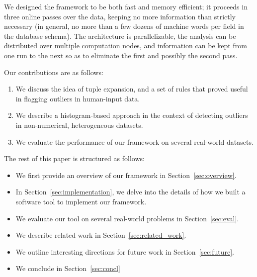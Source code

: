 We designed the framework to be both fast and memory efficient; it proceeds in three online passes over the data, keeping no more information than strictly necessary (in general, no more than a few dozens of machine words per field in the database schema). The architecture is parallelizable, the analysis can be distributed over multiple computation nodes, and information can be kept from one run to the next so as to eliminate the first and possibly the second pass.

Our contributions are as follows:
\begin{enumerate}
\item We discuss the idea of tuple expansion, and a set of rules that proved useful in flagging outliers in human-input data.
\item We describe a histogram-based approach in the context of detecting outliers in non-numerical, heterogeneous datasets.
\item We evaluate the performance of our framework on several real-world datasets.
\end{enumerate}

The rest of this paper is structured as follows:
\begin{itemize}
\item We first provide an overview of our framework in Section~\ref{sec:overview}.
\item In Section~\ref{sec:implementation}, we delve into the details of how we built a software tool to implement our framework.
\item We evaluate our tool on several real-world problems in Section~\ref{sec:eval}.
\item We describe related work in Section~\ref{sec:related_work}.
\item We outline interesting directions for future work in Section~\ref{sec:future}.
\item We conclude in Section~\ref{sec:concl}
\end{itemize}
